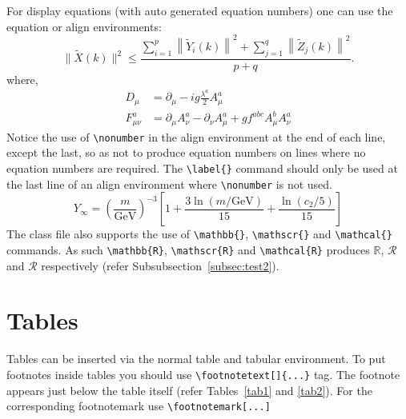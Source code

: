 For display equations (with auto generated equation numbers)
one can use the equation or align environments:
\begin{equation}
\|\tilde{X}(k)\|^2 \leq\frac{\sum\limits_{i=1}^{p}\left\|\tilde{Y}_i(k)\right\|^2+\sum\limits_{j=1}^{q}\left\|\tilde{Z}_j(k)\right\|^2 }{p+q}.\label{eq1}
\end{equation}
where,
\begin{align}
D_\mu &=  \partial_\mu - ig \frac{\lambda^a}{2} A^a_\mu \nonumber \\
F^a_{\mu\nu} &= \partial_\mu A^a_\nu - \partial_\nu A^a_\mu + g f^{abc} A^b_\mu A^a_\nu \label{eq2}
\end{align}
Notice the use of \verb+\nonumber+ in the align environment at the end
of each line, except the last, so as not to produce equation numbers on
lines where no equation numbers are required. The \verb+\label{}+ command
should only be used at the last line of an align environment where
\verb+\nonumber+ is not used.
\begin{equation}
Y_\infty = \left( \frac{m}{\textrm{GeV}} \right)^{-3}
    \left[ 1 + \frac{3 \ln(m/\textrm{GeV})}{15}
    + \frac{\ln(c_2/5)}{15} \right]
\end{equation}
The class file also supports the use of \verb+\mathbb{}+, \verb+\mathscr{}+ and
\verb+\mathcal{}+ commands. As such \verb+\mathbb{R}+, \verb+\mathscr{R}+
and \verb+\mathcal{R}+ produces $\mathbb{R}$, $\mathscr{R}$ and $\mathcal{R}$
respectively (refer Subsubsection~\ref{subsec:test2}).

\section{Tables}\label{sec:tables}

Tables can be inserted via the normal table and tabular environment. To put
footnotes inside tables you should use \verb+\footnotetext[]{...}+ tag.
The footnote appears just below the table itself (refer Tables~\ref{tab1} and \ref{tab2}). 
For the corresponding footnotemark use \verb+\footnotemark[...]+

